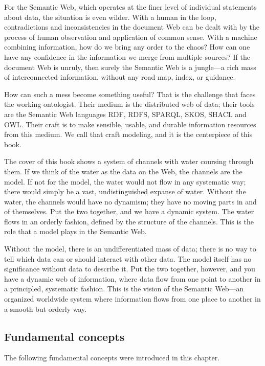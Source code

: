 For the Semantic Web, which operates at the finer level of individual
statements about data, the situation is even wilder. With a human in the
loop, contradictions and inconsistencies in the document Web can be
dealt with by the process of human observation and application of common
sense. With a machine combining information, how do we bring any order
to the chaos? How can one have any confidence in the information we
merge from multiple sources? If the document Web is unruly, then surely
the Semantic Web is a jungle---a rich mass of interconnected
information, without any road map, index, or guidance.

How can such a mess become something useful? That is the challenge that
faces the working ontologist. Their medium is the distributed web of
data; their tools are the Semantic Web languages RDF, RDFS, SPARQL,
SKOS, SHACL and OWL. Their craft is to make sensible, usable, and
durable information resources from this medium. We call that craft
modeling, and it is the centerpiece of this book.

The cover of this book shows a system of channels with water coursing
through them. If we think of the water as the data on the Web, the
channels are the model. If not for the model, the water would not flow
in any systematic way; there would simply be a vast, undistinguished
expanse of water. Without the water, the channels would have no
dynamism; they have no moving parts in and of themselves. Put the two
together, and we have a dynamic system. The water flows in an orderly
fashion, defined by the structure of the channels. This is the role that
a model plays in the Semantic Web.

Without the model, there is an undifferentiated mass of data; there is
no way to tell which data can or should interact with other data. The
model itself has no significance without data to describe it. Put the
two together, however, and you have a dynamic web of information, where
data flow from one point to another in a principled, systematic fashion.
This is the vision of the Semantic Web---an organized worldwide system
where information flows from one place to another in a smooth but
orderly way.

\subsection{Fundamental concepts}

The following fundamental concepts were introduced in this chapter.

